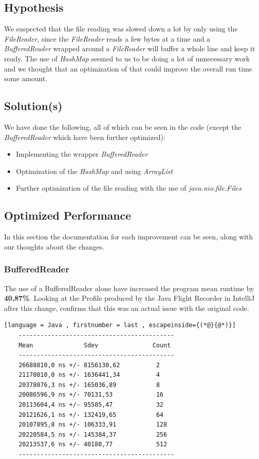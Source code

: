 \vspace{0.5cm}
\subsection{Hypothesis}
\label{sec:2.4}
We suspected that the file reading was slowed down a lot by only using the \emph{FileReader}, since the \emph{FileReader} reads a few bytes at a time and a \emph{BufferedReader} wrapped around a \emph{FileReader} will buffer a whole line and keep it ready. 
The use of \emph{HashMap} seemed to us to be doing a lot of unnecessary work and we thought that an optimization of that could improve the overall run time some amount.  

\vspace{0.5cm}
\subsection{Solution(s)}
\label{sec:2.5}

We have done the following, all of which can be seen in the code (except the \emph{BufferedReader} which have been further optimized):
\begin{itemize}
    \item Implementing the wrapper \emph{BufferedReader}
    \item Optimization of the \emph{HashMap} and using \emph{ArrayList}
    \item Further optimization of the file reading with the use of \emph{java.nio.file.Files}
\end{itemize}


\subsection{Optimized Performance}
\label{sec:2.6}
In this section the documentation for each improvement can be seen, along with our thoughts about the changes. 
\subsubsection{BufferedReader}
\label{sec:2.6.1}
The use of a BufferedReader alone have increased the program mean runtime by \textbf{40,87\%}. Looking at the Profile produced by the Java Flight Recorder in IntelliJ after this change, confirms that this was an actual issue with the original code.
\begin{lstlisting}[language = Java , firstnumber = last , escapeinside={(*@}{@*)}]
    -------------------------------------------
    Mean              Sdev               Count
    -------------------------------------------
    26688810,0 ns +/- 8156130,62          2
    21170010,0 ns +/- 1636441,34          4
    20378076,3 ns +/- 165036,89           8
    20086596,9 ns +/- 70131,53            16
    20113604,4 ns +/- 95585,47            32
    20121626,1 ns +/- 132419,65           64
    20107895,8 ns +/- 106333,91           128
    20220584,5 ns +/- 145384,37           256
    20213537,6 ns +/- 40180,77            512
    -------------------------------------------
\end{lstlisting}


